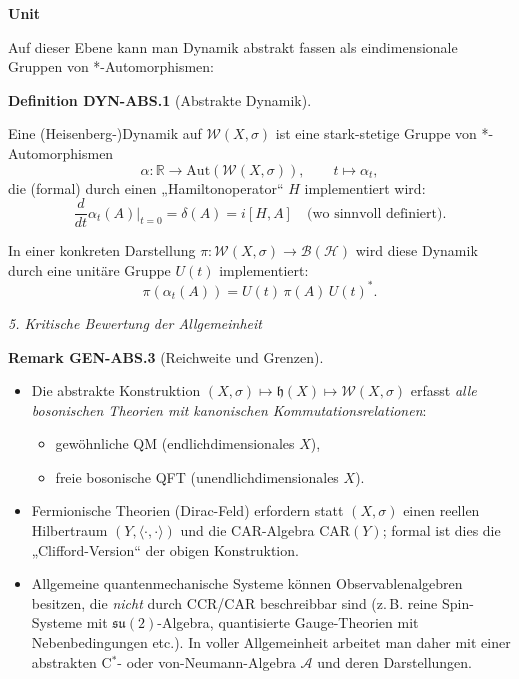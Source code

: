 \documentclass[10pt, letterpaper]{article}
\newcommand{\R}{\mathbb{R}}
\newcommand{\CustomHeading}[3]{%
  \par\medskip\noindent%
  \textbf{#1 #2} \textnormal{(#3)}.\enskip%
}
\newenvironment{DEF}[2]{\begin{unitbox}\CustomHeading{Definition}{#1}{#2}}{\end{unitbox}}
\newenvironment{REM}[2]{\begin{unitbox}\CustomHeading{Remark}{#1}{#2}}{\end{unitbox}}
\newenvironment{unit}[1]
  {\begin{unitbox}\textbf{Unit #1}\par\smallskip}
  {\end{unitbox}}
\begin{document}
\begin{unit}{}
Auf dieser Ebene kann man Dynamik abstrakt fassen als
eindimensionale Gruppen von *-Automorphismen:
\begin{DEF}{DYN-ABS.1}{Abstrakte Dynamik}
Eine (Heisenberg-)Dynamik auf \(\mathcal{W}(X,\sigma)\) ist
eine stark-stetige Gruppe von *-Automorphismen
\[
\alpha : \R \to \mathrm{Aut}(\mathcal{W}(X,\sigma)),\qquad
t\mapsto \alpha_t,
\]
die (formal) durch einen „Hamiltonoperator“ \(H\) implementiert wird:
\[
\frac{d}{dt}\alpha_t(A)\big|_{t=0}
= \delta(A) = i[H,A] \quad \text{(wo sinnvoll definiert)}.
\]
\end{DEF}

In einer konkreten Darstellung \(\pi:\mathcal{W}(X,\sigma)\to\mathcal{B}(\mathcal{H})\)
wird diese Dynamik durch eine unitäre Gruppe \(U(t)\) implementiert:
\[
\pi(\alpha_t(A)) = U(t)\,\pi(A)\,U(t)^\ast.
\]

\emph{5. Kritische Bewertung der Allgemeinheit}

\begin{REM}{GEN-ABS.3}{Reichweite und Grenzen}
\begin{itemize}
\item Die abstrakte Konstruktion \((X,\sigma)\mapsto \mathfrak{h}(X)\mapsto \mathcal{W}(X,\sigma)\)
      erfasst \emph{alle bosonischen Theorien mit kanonischen Kommutationsrelationen}:
      \begin{itemize}
      \item gewöhnliche QM (endlichdimensionales \(X\)),
      \item freie bosonische QFT (unendlichdimensionales \(X\)).
      \end{itemize}
\item Fermionische Theorien (Dirac-Feld) erfordern statt \((X,\sigma)\)
      einen reellen Hilbertraum \((Y,\langle\cdot,\cdot\rangle)\)
      und die CAR-Algebra \(\mathrm{CAR}(Y)\); formal ist dies
      die „Clifford-Version“ der obigen Konstruktion.
\item Allgemeine quantenmechanische Systeme können Observablenalgebren
      besitzen, die \emph{nicht} durch CCR/CAR beschreibbar sind
      (z.\,B. reine Spin-Systeme mit \(\mathfrak{su}(2)\)-Algebra,
      quantisierte Gauge-Theorien mit Nebenbedingungen etc.).
      In voller Allgemeinheit arbeitet man daher mit einer
      abstrakten C\(^\ast\)- oder von-Neumann-Algebra \(\mathcal{A}\)
      und deren Darstellungen.
\end{itemize}


\end{REM}
\end{unit}
\end{document}
